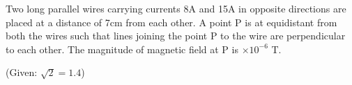 \item Two long parallel wires carrying currents 8A and 15A in opposite directions are placed at a distance of 7cm from each other. A point P is at equidistant from both the wires such that lines joining the point P to the wire are perpendicular to each other. The magnitude of magnetic field at P is \underline{\hspace{2.5cm}} $\times 10^{-6}$ T.

    (Given: $\sqrt{2}=1.4$)